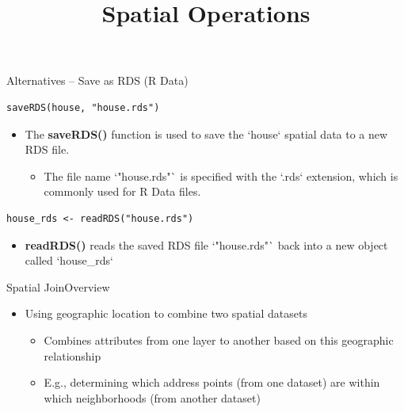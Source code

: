 \documentclass[dvipsnames,hyperref={pdfpagelabels=false}]{beamer}
\begin{document}
\begin{frame}[fragile]{Alternatives -- Save as RDS (R Data)
}
\begin{lstlisting}
saveRDS(house, "house.rds")
\end{lstlisting}
\begin{itemize}
	\item The \textbf{saveRDS()} function is used to save the `house` spatial data to a new RDS file.
	\vspace{0.2cm}
	\begin{itemize}
		\item The file name `"house.rds"` is specified with the `.rds` extension, which is commonly used for R Data files.
	\end{itemize}
\end{itemize}

\begin{lstlisting}
house_rds <- readRDS("house.rds")
\end{lstlisting}
\begin{itemize}
	\item \textbf{readRDS()} reads the saved RDS file `"house.rds"` back into a new object called `house\_rds`
\end{itemize}
\end{frame}





\title[]  
{Spatial Operations}


\author 
{}

\institute{}






\date
{}


\begin{frame}{}
	\titlepage
\end{frame}



\begin{frame}{Spatial Join}{Overview}
	\begin{itemize}
		\item Using geographic location to combine two spatial datasets 
				\vspace{0.2cm}
		\begin{itemize}
	\item Combines attributes from one layer to another based on this geographic relationship
					\vspace{0.2cm}
	\item E.g., determining which address points (from one dataset) are within which neighborhoods (from another dataset)			
				\end{itemize}	
				
				
	\end{itemize}
\end{frame}
\end{document}
